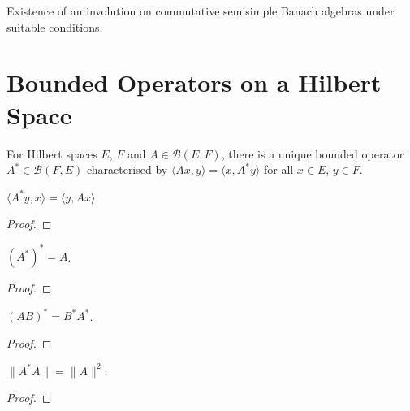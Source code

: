 \begin{theorem}
  \label{thm:commutative-involution}
  \leanok
  Existence of an involution on commutative semisimple Banach
  algebras under suitable conditions.
\end{theorem}

\chapter{Bounded Operators on a Hilbert Space}

\begin{definition}
  \label{def:adjoint}
  \leanok
  For Hilbert spaces $E$, $F$ and $A \in \mathcal{B}(E,F)$, there is a
  unique bounded operator $A^{*} \in \mathcal{B}(F,E)$ characterised
  by $\langle A x, y\rangle = \langle x, A^{*} y\rangle$ for all
  $x \in E$, $y \in F$.
\end{definition}

\begin{theorem}
  \label{thm:adjoint-inner-left}
  \leanok
  $\langle A^{*} y, x\rangle = \langle y, A x\rangle$.
\end{theorem}
\begin{proof}
  \leanok
\end{proof}

\begin{theorem}
  \label{thm:adjoint-adjoint}
  \leanok
  $(A^{*})^{*} = A$.
\end{theorem}
\begin{proof}
  \leanok
\end{proof}

\begin{theorem}
  \label{thm:adjoint-comp}
  \leanok
  $(AB)^{*} = B^{*} A^{*}$.
\end{theorem}
\begin{proof}
  \leanok
\end{proof}

\begin{theorem}
  \label{thm:cstar-identity}
  \leanok
  $\|A^{*} A\| = \|A\|^{2}$.
\end{theorem}
\begin{proof}
  \leanok
\end{proof}

